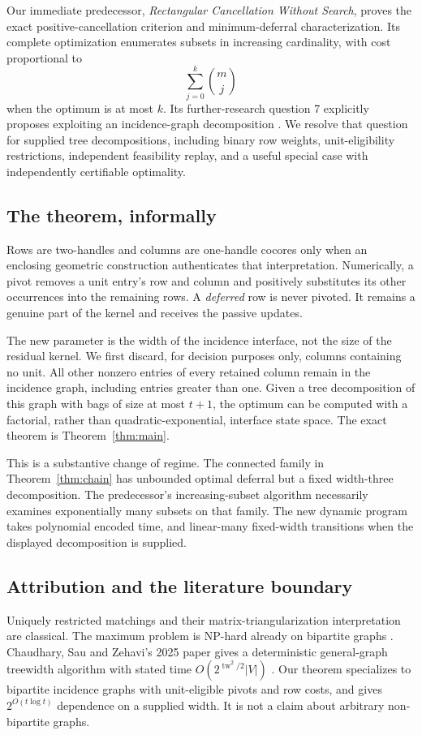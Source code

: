 \documentclass[11pt]{article}
\theoremstyle{definition}\newtheorem{definition}[theorem]{Definition}
\theoremstyle{remark}\newtheorem{remark}[theorem]{Remark}
\newcommand{\tw}{\operatorname{tw}}
\begin{document}
Our immediate predecessor, \emph{Rectangular Cancellation Without Search}, proves the exact positive-cancellation criterion and minimum-deferral characterization. Its complete optimization enumerates subsets in increasing cardinality, with cost proportional to
\begin{equation}
 \sum_{j=0}^{k}\binom mj
 \label{eq:old}
\end{equation}
when the optimum is at most $k$. Its further-research question 7 explicitly proposes exploiting an incidence-graph decomposition \cite{positive}. We resolve that question for supplied tree decompositions, including binary row weights, unit-eligibility restrictions, independent feasibility replay, and a useful special case with independently certifiable optimality.

\subsection{The theorem, informally}
Rows are two-handles and columns are one-handle cocores only when an enclosing geometric construction authenticates that interpretation. Numerically, a pivot removes a unit entry's row and column and positively substitutes its other occurrences into the remaining rows. A \emph{deferred} row is never pivoted. It remains a genuine part of the kernel and receives the passive updates.

The new parameter is the width of the incidence interface, not the size of the residual kernel. We first discard, for decision purposes only, columns containing no unit. All other nonzero entries of every retained column remain in the incidence graph, including entries greater than one. Given a tree decomposition of this graph with bags of size at most $t+1$, the optimum can be computed with a factorial, rather than quadratic-exponential, interface state space. The exact theorem is Theorem~\ref{thm:main}.

This is a substantive change of regime. The connected family in Theorem~\ref{thm:chain} has unbounded optimal deferral but a fixed width-three decomposition. The predecessor's increasing-subset algorithm necessarily examines exponentially many subsets on that family. The new dynamic program takes polynomial encoded time, and linear-many fixed-width transitions when the displayed decomposition is supplied.

\subsection{Attribution and the literature boundary}
Uniquely restricted matchings and their matrix-triangularization interpretation are classical. The maximum problem is NP-hard already on bipartite graphs \cite{golumbic}. Chaudhary, Sau and Zehavi's 2025 paper gives a deterministic general-graph treewidth algorithm with stated time $O(2^{\tw^2/2}|V|)$ \cite{csz}. Our theorem specializes to bipartite incidence graphs with unit-eligible pivots and row costs, and gives $2^{O(t\log t)}$ dependence on a supplied width. It is not a claim about arbitrary non-bipartite graphs.
\end{document}
